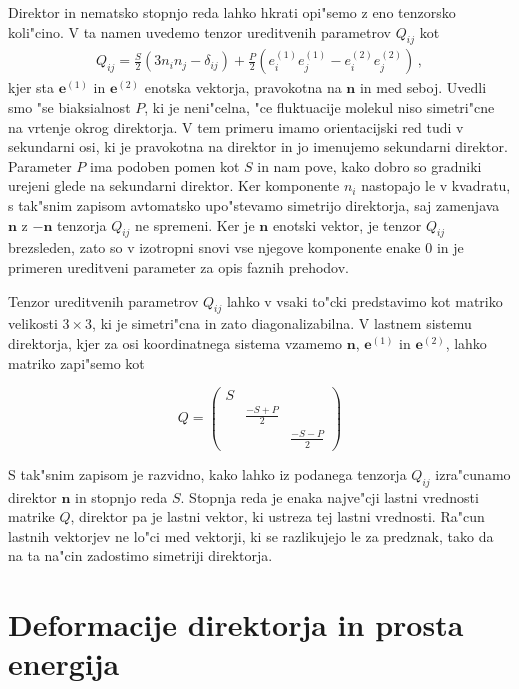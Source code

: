 \documentclass[12pt,twoside,openright,final]{report}
\renewcommand{\vec}{\mathbf}
\begin{document}
Direktor in nematsko stopnjo reda lahko hkrati opi"semo z eno tenzorsko koli"cino. V ta namen uvedemo tenzor ureditvenih parametrov $Q_{ij}$ kot
\begin{align}
  Q_{ij} = \frac{S}{2}(3n_i n_j - \delta_{ij}) + \frac{P}{2}(e^{(1)}_i e^{(1)}_j - e^{(2)}_i e^{(2)}_j)\,,
\end{align}
kjer sta $\mathbf{e}^{(1)}$ in $\mathbf{e}^{(2)}$ enotska vektorja, pravokotna na $\mathbf{n}$ in med seboj. Uvedli smo "se biaksialnost $P$, ki je neni"celna, "ce fluktuacije molekul niso simetri"cne na vrtenje okrog direktorja. V tem primeru imamo orientacijski red tudi v sekundarni osi, ki je pravokotna na direktor in jo imenujemo sekundarni direktor. Parameter $P$ ima podoben pomen kot $S$ in nam pove, kako dobro so gradniki urejeni glede na sekundarni direktor. Ker komponente $n_i$ nastopajo le v kvadratu, s tak"snim zapisom avtomatsko upo"stevamo simetrijo direktorja, saj zamenjava $\mathbf{n}$ z $-\mathbf{n}$ tenzorja $Q_{ij}$ ne spremeni. Ker je $\mathbf{n}$ enotski vektor, je tenzor $Q_{ij}$ brezsleden, zato so v izotropni snovi vse njegove komponente enake 0 in je primeren ureditveni parameter za opis faznih prehodov. 

Tenzor ureditvenih parametrov $Q_{ij}$ lahko v vsaki to"cki predstavimo kot matriko velikosti $3\times 3$, ki je simetri"cna in zato diagonalizabilna. 
V lastnem sistemu direktorja, kjer za osi koordinatnega sistema vzamemo $\vec n$, $\vec e^{(1)}$ in $\vec e^{(2)}$, lahko matriko zapi"semo kot

\begin{equation}
 Q = \begin{pmatrix}
  S &   & \\
  & \frac{-S+P}{2} & \\
  & & \frac{-S-P}{2}
 \end{pmatrix}
\end{equation}

S tak"snim zapisom je razvidno, kako lahko iz podanega tenzorja $Q_{ij}$ izra"cunamo direktor $\vec n$ in stopnjo reda $S$. 
Stopnja reda je enaka najve"cji lastni vrednosti matrike $Q$, direktor pa je lastni vektor, ki ustreza tej lastni vrednosti. 
Ra"cun lastnih vektorjev ne lo"ci med vektorji, ki se razlikujejo le za predznak, tako da na ta na"cin zadostimo simetriji direktorja. 

\section{Deformacije direktorja in prosta energija}
\end{document}
